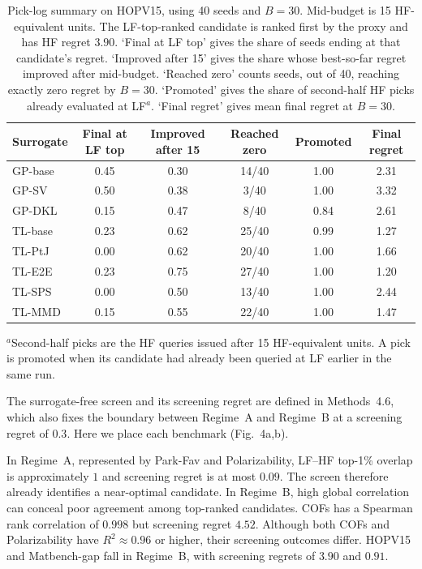 \begin{table}[p]
\centering
\scriptsize
\caption{Pick-log summary on HOPV15, using 40 seeds and $B = 30$. Mid-budget is 15 HF-equivalent units. The LF-top-ranked candidate is ranked first by the proxy and has HF regret $3.90$. `Final at LF top' gives the share of seeds ending at that candidate's regret. `Improved after 15' gives the share whose best-so-far regret improved after mid-budget. `Reached zero' counts seeds, out of 40, reaching exactly zero regret by $B = 30$. `Promoted' gives the share of second-half HF picks already evaluated at LF$^{a}$. `Final regret' gives mean final regret at $B = 30$.}
\label{supptab:hopv15_picklog}
\begin{tabular}{@{}lccccc@{}}
\toprule
Surrogate & Final at LF top & Improved after 15 & Reached zero & Promoted & Final regret \\
\midrule
GP-base & 0.45 & 0.30 & 14/40 & 1.00 & 2.31 \\
GP-SV & 0.50 & 0.38 & 3/40 & 1.00 & 3.32 \\
GP-DKL & 0.15 & 0.47 & 8/40 & 0.84 & 2.61 \\
TL-base & 0.23 & 0.62 & 25/40 & 0.99 & 1.27 \\
TL-PtJ & 0.00 & 0.62 & 20/40 & 1.00 & 1.66 \\
TL-E2E & 0.23 & 0.75 & 27/40 & 1.00 & 1.20 \\
TL-SPS & 0.00 & 0.50 & 13/40 & 1.00 & 2.44 \\
TL-MMD & 0.15 & 0.55 & 22/40 & 1.00 & 1.47 \\
\bottomrule
\end{tabular}
\par\smallskip
{\scriptsize $^{a}$Second-half picks are the HF queries issued after 15 HF-equivalent units. A pick is promoted when its candidate had already been queried at LF earlier in the same run.}
\end{table}


The surrogate-free screen and its screening regret are defined in Methods~4.6, which also fixes the boundary between Regime~A and Regime~B at a screening regret of $0.3$. Here we place each benchmark (Fig.~4a,b).

In Regime~A, represented by Park-Fav and Polarizability, LF--HF top-1\% overlap is approximately $1$ and screening regret is at most $0.09$. The screen therefore already identifies a near-optimal candidate. In Regime~B, high global correlation can conceal poor agreement among top-ranked candidates. COFs has a Spearman rank correlation of $0.998$ but screening regret $4.52$. Although both COFs and Polarizability have $R^2 \approx 0.96$ or higher, their screening outcomes differ. HOPV15 and Matbench-gap fall in Regime~B, with screening regrets of $3.90$ and $0.91$.


